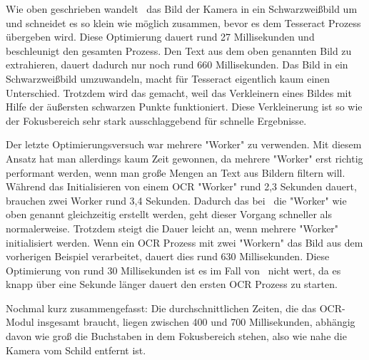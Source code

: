 Wie oben geschrieben wandelt \ZELIA\ das Bild der Kamera in ein Schwarzweißbild um und schneidet es so klein wie möglich zusammen, bevor es dem Tesseract Prozess übergeben wird. Diese Optimierung dauert rund 27 Millisekunden und beschleunigt den gesamten Prozess. Den Text aus dem oben genannten Bild zu extrahieren, dauert dadurch nur noch rund 660 Millisekunden. Das Bild in ein Schwarzweißbild umzuwandeln, macht für Tesseract eigentlich kaum einen Unterschied. Trotzdem wird das gemacht, weil das Verkleinern eines Bildes mit Hilfe der äußersten schwarzen Punkte funktioniert. Diese Verkleinerung ist so wie der Fokusbereich sehr stark ausschlaggebend für schnelle Ergebnisse. 

Der letzte Optimierungsversuch war mehrere "Worker" zu verwenden. Mit diesem Ansatz hat man allerdings kaum Zeit gewonnen, da mehrere "Worker" erst richtig performant werden, wenn man große Mengen an Text aus Bildern filtern will. Während das Initialisieren von einem OCR "Worker" rund 2,3 Sekunden dauert, brauchen zwei Worker rund 3,4 Sekunden. Dadurch das bei \ZELIA\ die "Worker" wie oben genannt gleichzeitig erstellt werden, geht dieser Vorgang schneller als normalerweise. Trotzdem steigt die Dauer leicht an, wenn mehrere "Worker" initialisiert werden. Wenn ein OCR Prozess mit zwei "Workern" das Bild aus dem vorherigen Beispiel verarbeitet, dauert dies rund 630 Millisekunden. Diese Optimierung von rund 30 Millisekunden ist es im Fall von \ZELIA\ nicht wert, da es knapp über eine Sekunde länger dauert den ersten OCR Prozess zu starten.

Nochmal kurz zusammengefasst: Die durchschnittlichen Zeiten, die das OCR-Modul insgesamt braucht, liegen zwischen 400 und 700 Millisekunden, abhängig davon wie groß die Buchstaben in dem Fokusbereich stehen, also wie nahe die Kamera vom Schild entfernt ist.

